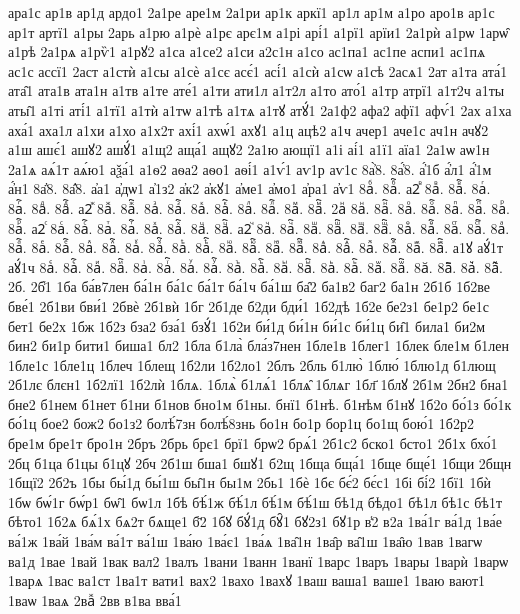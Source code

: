 {ара1с
ар1в
ар1д
ардо1
2а1ре
аре1м
2а1ри
ар1к
аркї1
ар1л
ар1м
а1ро
аро1в
ар1с
ар1т
артї1
а1ры
2арь
а1рю
а1рѐ
а1рє
арє1м
а1рі
арі́1
а1рї1
арїи1
2а1рѝ
а1рѡ
1арѡ̑
а1рѣ
2а1рѧ
а1рѷ1
а1рꙋ2
а1са
а1се2
а1си
а2с1н
а1со
ас1па1
ас1пе
аспи1
ас1пѧ
ас1с
ассї1
2аст
а1стѝ
а1сы
а1сѐ
а1сє
асє́1
асі́1
а1сѝ
а1сѡ
а1сѣ
2асѧ1
2ат
а1та
ата́1
ата̑1
ата1в
ата1н
а1тв
а1те
ате́1
а1ти
ати1л
а1т2л
а1то
ато́1
а1тр
атрї1
а1т2ч
а1ты
аты̑1
а1ті
аті́1
а1тї1
а1тѝ
а1тѡ
а1тѣ
а1тѧ
а1тꙋ
атꙋ́1
2а1ф2
афа2
афї1
афѵ́1
2ах
а1ха
аха́1
аха1л
а1хи
а1хо
а1х2т
ахі́1
ахѡ́1
ахꙋ1
а1ц
ацѣ2
а1ч
ачер1
аче1с
ач1н
ачꙋ2
а1ш
ашє́1
ашꙋ2
ашꙋ́1
а1щ2
аща́1
ащꙋ2
2а1ю
ающї1
а1і
аі́1
а1ї1
аїа1
2а1ѡ
аѡ1н
2а1ѧ
аѧ́1т
аѧ́ю1
аѯа́1
а1ѳ2
аѳа2
аѳо1
аѳі́1
а1ѵ́1
аѵ1р
аѵ1с
8а҆̀8.
8а҆́8.
а҆́1б
а҆́л1
а҆́1м
а҆́н1
8а҆̈8.
8а҆̑8.
а҆а1
а҆дѡ1
а҆1з2
а҆к2
а҆кꙋ1
а҆ме1
а҆мо1
а҆ра1
а҆ѵ1
8аⷠ.
8аⷠ҇.
а2ⷡ
8аⷡ.
8аⷡ҇.
8аⷢ.
8аⷢ҇.
8аⷣ.
8аⷣ҇.
а2ⷤ
8аⷤ.
8аⷤ҇.
8аⷥ.
8аⷥ҇.
8аⷦ.
8аⷦ҇.
8аⷧ.
8аⷧ҇.
8аⷨ.
8аⷨ҇.
2аⷩ
8аⷩ.
8аⷩ҇.
8аⷪ.
8аⷪ҇.
8аⷫ.
8аⷫ҇.
8аⷬ.
8аⷬ҇.
а2ⷭ
8аⷭ.
8аⷭ҇.
8аⷮ.
8аⷮ҇.
8аⷯ.
8аⷯ҇.
8аⷰ.
8аⷰ҇.
а2ⷱ
8аⷱ.
8аⷱ҇.
8аⷲ.
8аⷲ҇.
8аⷳ.
8аⷳ҇.
8аⷴ.
8аⷴ҇.
8аⷵ.
8аⷵ҇.
8аⷶ.
8аⷶ҇.
8аⷷ.
8аⷷ҇.
8аⷸ.
8аⷸ҇.
8аⷹ.
8аⷹ҇.
8аⷺ.
8аⷺ҇.
8аⷻ.
8аⷻ҇.
8аⷼ.
8аⷼ҇.
8аⷽ.
8аⷽ҇.
8аⷾ.
8аⷾ҇.
8аⷿ.
8аⷿ҇.
а1ꙋ
аꙋ́1т
аꙋ́1ч
8аꙴ.
8аꙴ҇.
8аꙵ.
8аꙵ҇.
8аꙶ.
8аꙶ҇.
8аꙷ.
8аꙷ҇.
8аꙸ.
8аꙸ҇.
8аꙹ.
8аꙹ҇.
8аꙺ.
8аꙺ҇.
8аꙻ.
8аꙻ҇.
8а꙼.
8а꙼҇.
8а꙽.
8а꙽҇.
2б.
2б̾1
1ба
ба́в7лен
ба́1н
ба́1с
ба́1т
ба́1ч
ба́1ш
ба̑2
ба1в2
баг2
ба1н
2б1б
1б2ве
бве́1
2б1ви
бви́1
2бвѐ
2б1вѝ
1бг
2б1де
б2ди
бди́1
1б2дѣ
1б2е
бе2з1
бе1р2
бе1с
бет1
бе2х
1бж
1б2з
бза2
бза́1
бзꙋ́1
1б2и
би́1д
би́1н
би́1с
би́1ц
би̑1
била1
би2м
бин2
би1р
бити1
биша1
бл2
1бла
б1ла̀
бла́з7нен
1бле1в
1блег1
1блек
бле1м
б1лен
1бле1с
1бле1ц
1блеч
1блещ
1б2ли
1б2ло1
2блъ
2бль
б1лю̀
1блю́
1блю1д
б1лющ
2б1лє
блєн1
1б2лї1
1б2лѝ
1блѧ.
1блѧ̀
б1лѧ́1
1блѧ̑
1блѧг
1бл҃
1блꙋ
2б1м
2бн2
бна1
бне2
б1нем
б1нет
б1ни
б1нов
бно1м
б1ны.
бнї1
б1нѣ.
б1нѣм
б1нꙋ
1б2о
бо́1з
бо́1к
бо́1ц
бое2
бож2
бо1з2
болѣ́7зн
болѣ́8знь
бо1н
бо1р
бор1ц
бо1щ
бою́1
1б2р2
бре1м
бре1т
бро1н
2бръ
2брь
брє1
брї1
брѡ2
брѧ́1
2б1с2
бско1
бсто1
2б1х
бхо́1
2бц
б1ца
б1цы
б1цꙋ
2бч
2б1ш
бша1
бшꙋ1
б2щ
1бща
бща́1
1бще
бще́1
1бщи
2бщн
1бщї2
2б2ъ
1бы
бы́1д
бы́1ш
бы̑1н
бы1м
2бь1
1бѐ
1бє
бє́2
бє́с1
1бі
бі́2
1бї1
1бѝ
1бѡ
бѡ́1г
бѡ́р1
бѡ̑1
бѡ1л
1бѣ
бѣ́1ж
бѣ́1л
бѣ́1м
бѣ́1ш
бѣ1д
бѣдо1
бѣ1л
бѣ1с
бѣ1т
бѣто1
1б2ѧ
бѧ́1х
бѧ2т
бѧще1
б҃2
1бꙋ
бꙋ́1д
бꙋ̑1
бꙋ2з1
бꙋ1р
в̾2
в2а
1ва́1г
ва́1д
1ва́е
ва́1ж
1ва́й
1ва́м
ва́1т
ва́1ш
1ва́ю
1ва́є1
1ва́ѧ
1ва̑1н
1ва̑р
ва̑1ш
1ва̑ю
1вав
1вагѡ
ва1д
1вае
1вай
1вак
вал2
1валъ
1вани
1ванн
1ванї
1варс
1варъ
1вары
1варѝ
1варѡ
1варѧ
1вас
ва1ст
1ва1т
вати1
вах2
1вахо
1вахꙋ
1ваш
ваша1
ваше1
1ваю
вают1
1ваѡ
1ваѧ
2ваⷤ
2вв
в1ва
вва́1
}
